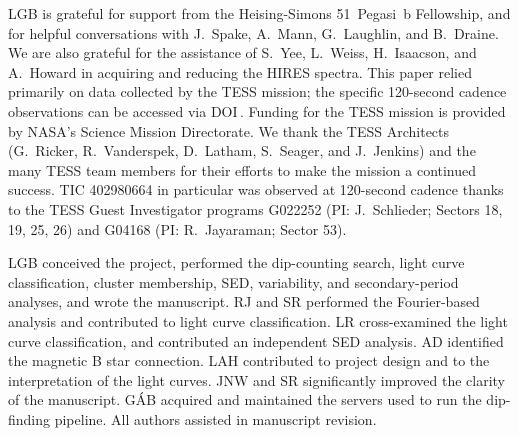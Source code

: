 \documentclass[11pt,twocolumn,tighten]{aastex63}
\begin{document}
\acknowledgments
LGB is grateful for support from the Heising-Simons 51~Pegasi~b
Fellowship, and for helpful conversations with
J.~Spake, A.~Mann, G.~Laughlin, and B.~Draine.  
We are also grateful for the assistance of S.~Yee,
L.~Weiss, H.~Isaacson, and A.~Howard in acquiring and reducing the
HIRES spectra.
This paper relied primarily on data collected by the TESS mission; the specific
120-second cadence observations can be accessed via
DOI\,.
Funding for the TESS mission is provided by NASA’s Science Mission
Directorate.  
We thank the TESS Architects (G.~Ricker, R.~Vanderspek, D.~Latham, S.~Seager, and J.~Jenkins) and the many TESS team members for their efforts to make the mission a continued success. 
TIC 402980664 in particular was observed at 120-second
cadence thanks to the TESS Guest Investigator programs G022252 (PI:
J.~Schlieder; Sectors 18, 19, 25, 26) and G04168 (PI: R.~Jayaraman;
Sector 53). 

LGB conceived the project, performed the dip-counting search, light curve classification, cluster membership, SED, variability, and secondary-period analyses, and wrote the manuscript.
RJ and SR performed the Fourier-based analysis and contributed to light curve classification.
LR cross-examined the light curve classification, and contributed an independent SED analysis.
AD identified the magnetic B star connection.
LAH contributed to project design and to the interpretation of the light curves.
JNW and SR significantly improved the clarity of the manuscript.
G\'AB acquired and maintained the servers used to run the dip-finding pipeline.
All authors assisted in manuscript revision.

\end{document}
